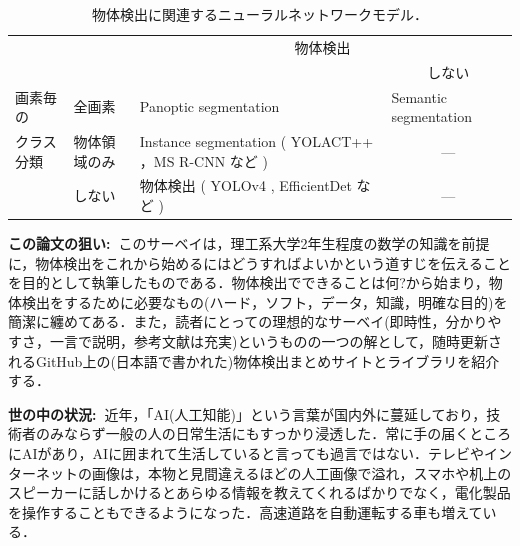 \documentclass[originalpaper]{jsaiart}     %
\begin{document}
\begin{table}
    \caption{物体検出に関連するニューラルネットワークモデル．}
    \label{tbl-select-l}
    \begin{center}
        \setlength{\doublerulesep}{0.5pt}
        \begin{tabularx}{\linewidth}{|p{1.7cm}|p{1.0cm}||X|p{3.3cm}|} \hline
            \multicolumn{2}{|c||}{} & \multicolumn{2}{c|}{物体検出} \\ \cline{3-4}
            \multicolumn{2}{|l||}{} & \centering{する} & \multicolumn{1}{c|}{しない} \\ \hline\hline
            画素毎の & 全画素 & Panoptic segmentation \cite{KHGRD19} & Semantic segmentation \\ \cline{2-4}
            クラス分類 & 物体領域のみ  & Instance segmentation ( YOLACT++ \cite{BZXL20}，MS R-CNN \cite{HHGHW19} など ) &  \multicolumn{1}{c|}{---} \\ \cline{2-4}
            & しない & 物体検出 ( YOLOv4 \cite{BWL20}, EfficientDet \cite{TPL20} など ) & \multicolumn{1}{c|}{---} \\ 
            \hline
        \end{tabularx}
    \end{center}
\end{table}



{\bf この論文の狙い:\ }このサーベイは，理工系大学2年生程度の数学の知識を前提に，物体検出をこれから始めるにはどうすればよいかという道すじを伝えることを目的として執筆したものである．物体検出でできることは何?から始まり，物体検出をするために必要なもの(ハード，ソフト，データ，知識，明確な目的)を簡潔に纏めてある．また，読者にとっての理想的なサーベイ(即時性，分かりやすさ，一言で説明，参考文献は充実)というものの一つの解として，随時更新されるGitHub上の(日本語で書かれた)物体検出まとめサイトとライブラリを紹介する．

{\bf 世の中の状況:\ }近年，「AI(人工知能)」という言葉が国内外に蔓延しており，技術者のみならず一般の人の日常生活にもすっかり浸透した．常に手の届くところにAIがあり，AIに囲まれて生活していると言っても過言ではない．テレビやインターネットの画像は，本物と見間違えるほどの人工画像で溢れ，スマホや机上のスピーカーに話しかけるとあらゆる情報を教えてくれるばかりでなく，電化製品を操作することもできるようになった．高速道路を自動運転する車も増えている．
\end{document}
